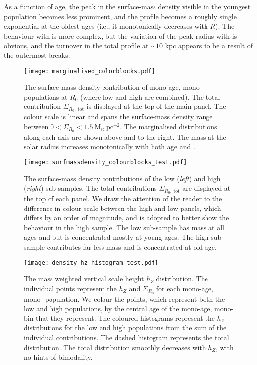 As a function of age, the peak in the surface-mass density visible in the youngest population becomes less prominent, and the profile becomes a roughly single exponential at the oldest ages (i.e., it monotonically decreases with $R$).  The behaviour with \feh{} is more complex, but the variation of the peak radius with \feh{} is obvious, and the turnover in the total profile at $\sim 10$ kpc appears to be a result of the outermost breaks.

\begin{figure*}
	\texttt{[image: marginalised\_colorblocks.pdf]}
	\centering
    \caption{The surface-mass density contribution of mono-age, mono-\feh{} populations at $R_0$ (where low and high \afe{} are combined). The total contribution $\Sigma_{R_0,\ \mathrm{tot}}$ is displayed at the top of the main panel. The colour scale is linear and spans the surface-mass density range between $0 < \Sigma_{R_0} < 1.5\ \mathrm{M_{\odot}\ pc^{-2}}$. The marginalised distributions along each axis are shown above and to the right. The mass at the solar radius increases monotonically with both age and \feh{}. }
    \label{fig:margmass}
\end{figure*}

\begin{figure*}
	\texttt{[image: surfmassdensity\_colourblocks\_test.pdf]}
	\centering
    \caption{The surface-mass density contributions of the low (\emph{left}) and high (\emph{right}) \afe{} sub-samples. The total contributions $\Sigma_{R_0,\ \mathrm{tot}}$ are displayed at the top of each panel. We draw the attention of the reader to the difference in colour scale between the high and low \afe{} panels, which differs by an order of magnitude, and is adopted to better show the behaviour in the high \afe{} sample. The low \afe{} sub-sample has mass at all ages and \feh{} but is concentrated mostly at young ages. The high \afe{} sub-sample contributes far less mass and is concentrated at old age.}
    \label{fig:massafe}
\end{figure*}



\begin{figure}
	\texttt{[image: density\_hz\_histogram\_test.pdf]}
	\centering
    \caption{The mass weighted vertical scale height $h_Z$ distribution. The individual points represent the $h_Z$ and $\Sigma_{R_0}$ for each mono-age, mono-\feh{} population. We colour the points, which represent both the low and high \afe{} populations, by the central age of the mono-age, mono-\feh{} bin that they represent. The coloured histograms represent the $h_Z$ distributions for the low and high \afe{} populations from the sum of the individual contributions. The dashed histogram represents the total distribution. The total distribution smoothly decreases with $h_Z$, with no hints of bimodality.}
    \label{fig:hzhistogram}
\end{figure}

